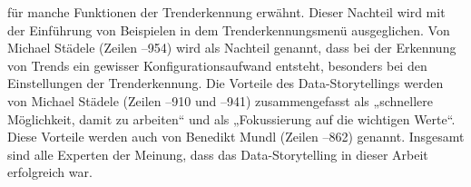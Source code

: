 für manche Funktionen der Trenderkennung erwähnt. Dieser Nachteil wird mit der Einführung von Beispielen in dem Trenderkennungsmenü ausgeglichen. Von Michael Städele (Zeilen --954) wird als Nachteil genannt, dass bei der Erkennung von Trends ein gewisser Konfigurationsaufwand entsteht, besonders bei den Einstellungen der Trenderkennung. Die Vorteile des Data-Storytellings werden von Michael Städele (Zeilen --910 und --941) zusammengefasst als „schnellere Möglichkeit, damit zu arbeiten“ und als „Fokussierung auf die wichtigen Werte“. Diese Vorteile werden auch von Benedikt Mundl (Zeilen --862) genannt. Insgesamt sind alle Experten der Meinung, dass das Data-Storytelling in dieser Arbeit erfolgreich war.
